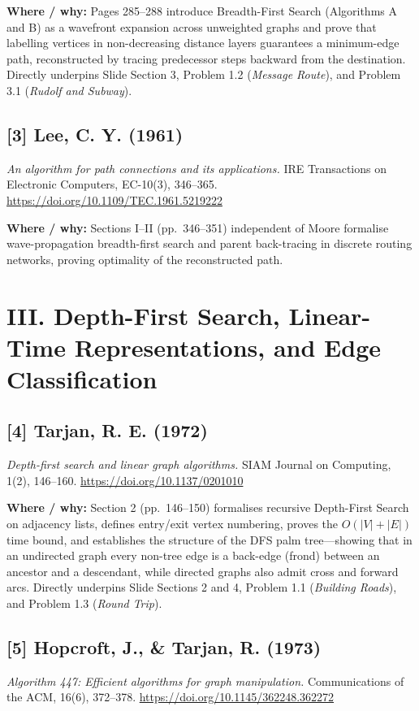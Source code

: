 \documentclass[11pt]{article}
\begin{document}
\textbf{Where / why:}
Pages 285--288 introduce Breadth-First Search (Algorithms A and B) as a wavefront expansion across unweighted graphs and prove that labelling vertices in non-decreasing distance layers guarantees a minimum-edge path, reconstructed by tracing predecessor steps backward from the destination. Directly underpins Slide Section 3, Problem 1.2 (\emph{Message Route}), and Problem 3.1 (\emph{Rudolf and Subway}).

\subsection*{[3] Lee, C. Y. (1961)}
\textit{An algorithm for path connections and its applications.}
IRE Transactions on Electronic Computers, EC-10(3), 346--365.
\url{https://doi.org/10.1109/TEC.1961.5219222}

\textbf{Where / why:}
Sections I--II (pp.~346--351) independent of Moore formalise wave-propagation breadth-first search and parent back-tracing in discrete routing networks, proving optimality of the reconstructed path.

\section*{III. Depth-First Search, Linear-Time Representations, and Edge Classification}

\subsection*{[4] Tarjan, R. E. (1972)}
\textit{Depth-first search and linear graph algorithms.}
SIAM Journal on Computing, 1(2), 146--160.
\url{https://doi.org/10.1137/0201010}

\textbf{Where / why:}
Section 2 (pp.~146--150) formalises recursive Depth-First Search on adjacency lists, defines entry/exit vertex numbering, proves the $O(|V| + |E|)$ time bound, and establishes the structure of the DFS palm tree---showing that in an undirected graph every non-tree edge is a back-edge (frond) between an ancestor and a descendant, while directed graphs also admit cross and forward arcs. Directly underpins Slide Sections 2 and 4, Problem 1.1 (\emph{Building Roads}), and Problem 1.3 (\emph{Round Trip}).

\subsection*{[5] Hopcroft, J., \& Tarjan, R. (1973)}
\textit{Algorithm 447: Efficient algorithms for graph manipulation.}
Communications of the ACM, 16(6), 372--378.
\url{https://doi.org/10.1145/362248.362272}
\end{document}

